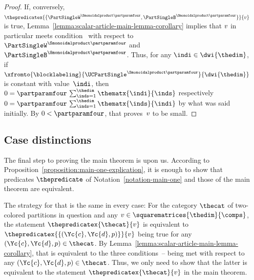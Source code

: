\documentclass[pdftex]{sigma}
\numberwithin{equation}{section}
\begin{document}
{\begin{proof}
If, conversely, $\thepredicatex{\{\PartSingleW^{\Smonoidalproduct\partparamfour},\PartSingleB^{\Smonoidalproduct\partparamfour}\}}{\themat}$ is true, Lem\-ma~\ref{lemma:scalar-article-main-lemma-corollary} implies that $\themat$ in particular meets con\-di\-tion~\conditionone{} with respect to $\PartSingleW^{\Smonoidalproduct\partparamfour}$ and $\PartSingleB^{\Smonoidalproduct\partparamfour}$. Thus, for any $\indi\in\dwi{\thedim}$, if  $\xfromto{\blocklabeling}{\UCPartSingle^{\Smonoidalproduct\partparamfour}}{\dwi{\thedim}}$ is constant with value~$\indi$, then $0=\partparamfour\,\sum_{\inds=1}^\thedim \thematx{\indi}{\inds}$ respectively $0=\partparamfour\,\sum_{\inds=1}^\thedim \thematx{\inds}{\indi}$ by what was said initially. By $0<\partparamfour$, that proves~$\themat$ to be small.
\end{proof}
}

\subsection{Case distinctions}
\label{section:main-one-case-distinctions}
{
  \newcommand{\incol}{\Yc{c}}
  \newcommand{\outcol}{\Yc{d}}
  \newcommand{\thepartition}{p}
  \newcommand{\themat}{v}
  The final step to proving the main theorem is upon us.  According to Pro\-po\-si\-tion~\ref{proposition:main-one-explication}, it is enough to show that predicates $\thepredicate$ of Notation~\ref{notation-main-one} and those of the main theorem are equivalent.

  The strategy for that is the same in every case: For the category $\thecat$ of two-colored partitions in question and any $\themat\in\squarematrices{\thedim}{\comps}$, the statement $\thepredicatex{\thecat}{\themat}$ is equivalent to $\thepredicatex{\{(\incol,\outcol,\thepartition)\}}{\themat}$ being true for any $(\incol,\outcol,\thepartition)\in\thecat$. By Lem\-ma~\ref{lemma:scalar-article-main-lemma-corollary}, that is equivalent to the three conditions~\conditionone{}--\conditionthree{} being met with respect to any $(\incol,\outcol,\thepartition)\in\thecat$. Thus, we only need to show that the latter is equivalent to  the statement $\thepredicatex{\thecat}{\themat}$ in the main theorem.
}
\end{document}
